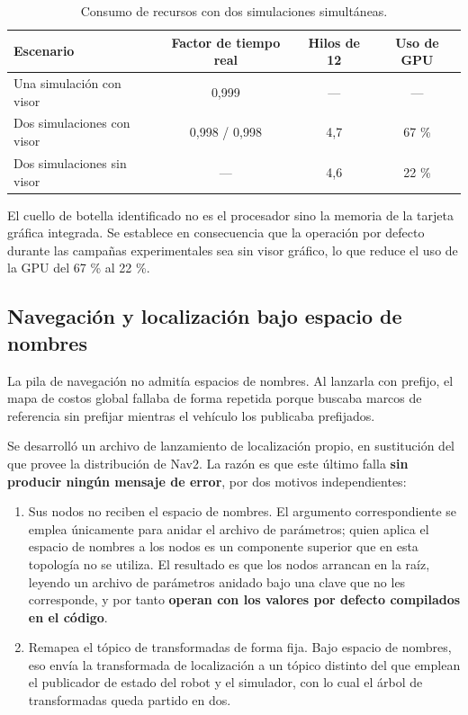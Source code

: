 \documentclass[12pt,letterpaper]{article}
\begin{document}
\begin{table}[H]
    \centering
    \small
    \caption{Consumo de recursos con dos simulaciones simultáneas.}
    \label{tab:recursos}
    \begin{tabular}{@{}lccc@{}}
        \toprule
        \textbf{Escenario} & \textbf{Factor de tiempo real} & \textbf{Hilos de 12} & \textbf{Uso de GPU} \\ \midrule
        Una simulación con visor       & 0,999 & ---  & ---    \\
        Dos simulaciones con visor     & 0,998 / 0,998 & 4,7 & 67 \% \\
        Dos simulaciones sin visor     & ---   & 4,6  & 22 \% \\ \bottomrule
    \end{tabular}
\end{table}

El cuello de botella identificado no es el procesador sino la memoria de la tarjeta gráfica integrada. Se establece en consecuencia que la operación por defecto durante las campañas experimentales sea sin visor gráfico, lo que reduce el uso de la GPU del 67 \% al 22 \%.

\subsection{Navegación y localización bajo espacio de nombres}

La pila de navegación no admitía espacios de nombres. Al lanzarla con prefijo, el mapa de costos global fallaba de forma repetida porque buscaba marcos de referencia sin prefijar mientras el vehículo los publicaba prefijados.

Se desarrolló un archivo de lanzamiento de localización propio, en sustitución del que provee la distribución de Nav2. La razón es que este último falla \textbf{sin producir ningún mensaje de error}, por dos motivos independientes:

\begin{enumerate}[leftmargin=*]
    \item Sus nodos no reciben el espacio de nombres. El argumento correspondiente se emplea únicamente para anidar el archivo de parámetros; quien aplica el espacio de nombres a los nodos es un componente superior que en esta topología no se utiliza. El resultado es que los nodos arrancan en la raíz, leyendo un archivo de parámetros anidado bajo una clave que no les corresponde, y por tanto \textbf{operan con los valores por defecto compilados en el código}.
    \item Remapea el tópico de transformadas de forma fija. Bajo espacio de nombres, eso envía la transformada de localización a un tópico distinto del que emplean el publicador de estado del robot y el simulador, con lo cual el árbol de transformadas queda partido en dos.
\end{enumerate}
\end{document}
